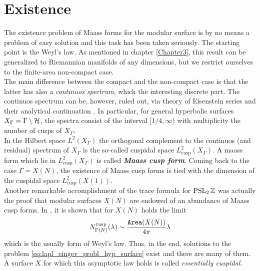 
\section{Existence}

The existence problem of Maass forms for the modular surface is by no means a problem of easy solution and this task has been taken seriously. The starting point is the Weyl's law. As mentioned in chapter \ref{Chapter3}, this result can be generalized to Riemannian manifolds of any dimensions, but we restrict ourselves to the finite-area non-compact case.\\
The main difference between the compact and the non-compact case is that the latter has also a \emph{continuos spectrum}, which  the interesting discrete part. The continuos spectrum can be, however, ruled out, via theory of Eisenstein series and their analytical continuation \cite{Shimura:book}. In particular, for general hyperbolic surfaces $X_{\Gamma}=\Gamma\setminus\mathcal{H}$, the spectra consist of the interval $[1/4,\infty)$ with multiplicity the number of cusps of $X_{\Gamma}$.\\

In the Hilbert space $L^{2}(X_{\Gamma})$ the orthogonal complement to the continuos (and residual) spectrum of $X_{\Gamma}$ is the so-called cuspidal space $L^{2}_{\text{cusp}}(X_{\Gamma})$. A maass form which lie in $L^{2}_{\text{cusp}}(X_{\Gamma})$ is called \emph{\textbf{Maass cusp form}}. Coming back to the case $\Gamma=X(N)$, the existence of Maass cusp forms is tied with the dimension of the cuspidal space $L^{2}_{\text{cusp}}(X(1))$.\\
Another remarkable accomplishment of the trace formula for $\operatorname{PSL}_{2}\mathbb{Z}$ was actually the proof that modular surfaces $X(N)$ are endowed of an abundance of Maass cusp forms.
In \cite{Sarnak:review}, it is shown that for $X(N)$ holds the limit
\[
N_{\Gamma(N)}^{\text{cusp}}(\lambda)\sim \frac{\operatorname{\mathtt{Area}}(X(N))}{4\pi}\lambda
\]
which is the usually form of Weyl's law. Thus, in the end, solutions to the problem \ref{eq:lapl_eingev_probl_hyp_surface} exist and there are many of them. A surface $X$ for which this asymptotic law holds is called \emph{essentially cuspidal}.





